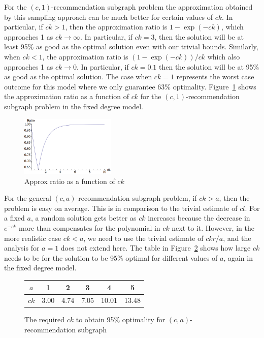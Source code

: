 For the $(c, 1)$-recommendation subgraph problem the approximation obtained by this sampling approach can be much better for certain values of $ck$. In particular,
if $ck>1$, then the approximation ratio is $1-\exp(-ck)$, which
approaches 1 as $ck\to\infty$. In particular, if $ck=3$, then the
solution will be at least 95\% as good as the optimal solution even
with our trivial bounds. Similarly, when $ck<1$, the approximation
ratio is $(1-\exp(-ck))/ck$ which also approaches 1 as $ck\to 0$. In
particular, if $ck=0.1$ then the solution will be at 95\% as good as
the optimal solution. The case when $ck=1$ represents the
worst case outcome for this model where we only guarantee 63\%
optimality. Figure~\ref{fig:simple_approx} shows the approximation ratio as a
function of $ck$ for the $(c,1)$-recommendation subgraph problem in the fixed degree model.\vs

\begin{figure}[H]
  \centering
  \includegraphics[width=0.4\textwidth]{images/sri_Original.png}
  \caption{Approx ratio as a function of $ck$ }\label{fig:simple_approx}
\end{figure}

For the general $(c, a)$-recommendation subgraph problem, if $ck>a$,
then the problem is easy on average. This is in comparison to the
trivial estimate of $cl$. For a fixed $a$, a random solution gets
better as $ck$ increases because the decrease in $e^{-ck}$ more than
compensates for the polynomial in $ck$ next to it. However, in the
more realistic case $ck<a$, we need to use the trivial estimate of
$ckr/a$, and the analysis for $a=1$ does not extend here. The table
in Figure~\ref{a-values} shows how large $ck$ needs to be for the
solution to be 95\% optimal for different values of $a$, again in the fixed degree model.\vs

\begin{figure}[H]
  \centering
  \begin{tabular}{ |c|c|c|c|c|c| }
    \hline
    $a$ & 1 & 2 & 3 & 4 & 5 \\ \hline
    $ck$ & 3.00 & 4.74 & 7.05 & 10.01 & 13.48 \\
    \hline
  \end{tabular}
  \caption{The required $ck$ to obtain 95\% optimality for $(c, a)$-recommendation subgraph}
  \label{a-values}
\end{figure}


